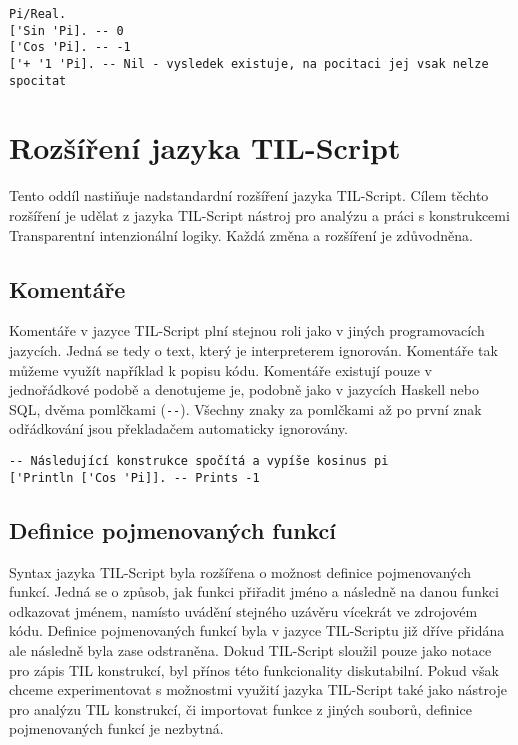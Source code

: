 \begin{lstlisting}[caption={Příklad využití symbolických hodnot}]
Pi/Real.
['Sin 'Pi]. -- 0
['Cos 'Pi]. -- -1
['+ '1 'Pi]. -- Nil - vysledek existuje, na pocitaci jej vsak nelze spocitat
\end{lstlisting}

\section{Rozšíření jazyka TIL-Script}

Tento oddíl nastiňuje nadstandardní rozšíření jazyka TIL-Script. Cílem těchto rozšíření je udělat
z jazyka TIL-Script nástroj pro analýzu a práci s konstrukcemi Transparentní intenzionální logiky.
Každá změna a rozšíření je zdůvodněna.

\subsection{Komentáře}

Komentáře v jazyce TIL-Script plní stejnou roli jako v jiných programovacích jazycích. Jedná se tedy
o text, který je interpreterem ignorován. Komentáře tak můžeme využít například k popisu kódu.
Komentáře existují pouze v jednořádkové podobě a denotujeme je, podobně jako v jazycích Haskell
nebo SQL, dvěma pomlčkami (\lstinline{--}). Všechny znaky za pomlčkami až po první znak odřádkování
jsou překladačem automaticky ignorovány.

\begin{lstlisting}[caption={Příklad využití komentářů}]
-- Následující konstrukce spočítá a vypíše kosinus pi
['Println ['Cos 'Pi]]. -- Prints -1
\end{lstlisting}

\subsection{Definice pojmenovaných funkcí}\label{fn-definition}

Syntax jazyka TIL-Script byla rozšířena o možnost definice pojmenovaných funkcí. Jedná se o způsob,
jak funkci přiřadit jméno a následně na danou funkci odkazovat jménem, namísto uvádění stejného
uzávěru vícekrát ve zdrojovém kódu. Definice pojmenovaných funkcí byla v jazyce TIL-Scriptu již
dříve přidána ale následně byla zase odstraněna. Dokud TIL-Script sloužil pouze jako notace pro
zápis TIL konstrukcí, byl přínos této funkcionality diskutabilní. Pokud však chceme experimentovat
s možnostmi využití jazyka TIL-Script také jako nástroje pro analýzu TIL konstrukcí, či importovat
funkce z jiných souborů, definice pojmenovaných funkcí je nezbytná.

